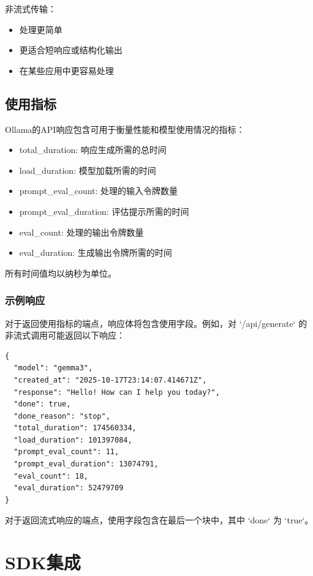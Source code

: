 \documentclass[12pt,UTF8]{ctexbook}
\begin{document}
非流式传输：

\begin{itemize}
  \item 处理更简单
  \item 更适合短响应或结构化输出
  \item 在某些应用中更容易处理
\end{itemize}

\subsection{使用指标}

Ollama的API响应包含可用于衡量性能和模型使用情况的指标：

\begin{itemize}
  \item total_duration: 响应生成所需的总时间
  \item load_duration: 模型加载所需的时间
  \item prompt_eval_count: 处理的输入令牌数量
  \item prompt_eval_duration: 评估提示所需的时间
  \item eval_count: 处理的输出令牌数量
  \item eval_duration: 生成输出令牌所需的时间
\end{itemize}

所有时间值均以纳秒为单位。

\subsubsection{示例响应}

对于返回使用指标的端点，响应体将包含使用字段。例如，对 `/api/generate` 的非流式调用可能返回以下响应：

\begin{verbatim}
{
  "model": "gemma3",
  "created_at": "2025-10-17T23:14:07.414671Z",
  "response": "Hello! How can I help you today?",
  "done": true,
  "done_reason": "stop",
  "total_duration": 174560334,
  "load_duration": 101397084,
  "prompt_eval_count": 11,
  "prompt_eval_duration": 13074791,
  "eval_count": 18,
  "eval_duration": 52479709
}
\end{verbatim}

对于返回流式响应的端点，使用字段包含在最后一个块中，其中 `done` 为 `true`。

\section{SDK集成}
\end{document}
